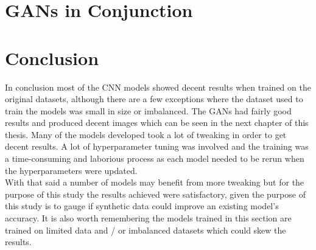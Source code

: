 \section{GANs in Conjunction}
\section{Conclusion}
In conclusion most of the CNN models showed decent results when trained on the original datasets, although there are a few exceptions where the dataset used to train the models was small in size or imbalanced.  The GANs had fairly good results and produced decent images which can be seen in the next chapter of this thesis.  Many of the models developed took a lot of tweaking in order to get decent results.  A lot of hyperparameter tuning was involved and the training was a time-consuming and laborious process as each model needed to be rerun when the hyperparameters were updated.
\\
With that said a number of models may benefit from more tweaking but for the purpose of this study the results achieved were satisfactory, given the purpose of this study is to gauge if synthetic data could improve an existing model's accuracy.  It is also worth remembering the models trained in this section are trained on limited data and / or imbalanced datasets which could skew the results. 

